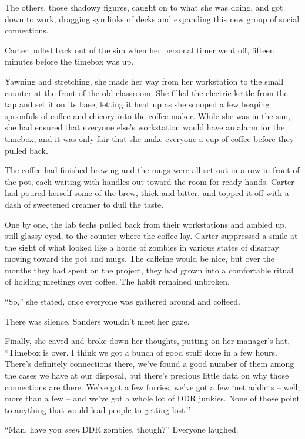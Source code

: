 The others, those shadowy figures, caught on to what she was doing, and got down to work, dragging symlinks of decks and expanding this new group of social connections.

\secdiv

Carter pulled back out of the sim when her personal timer went off, fifteen minutes before the timebox was up.

Yawning and stretching, she made her way from her workstation to the small counter at the front of the old classroom. She filled the electric kettle from the tap and set it on its base, letting it heat up as she scooped a few heaping spoonfuls of coffee and chicory into the coffee maker. While she was in the sim, she had ensured that everyone else's workstation would have an alarm for the timebox, and it was only fair that she make everyone a cup of coffee before they pulled back.

The coffee had finished brewing and the mugs were all set out in a row in front of the pot, each waiting with handles out toward the room for ready hands. Carter had poured herself some of the brew, thick and bitter, and topped it off with a dash of sweetened creamer to dull the taste.

One by one, the lab techs pulled back from their workstations and ambled up, still glassy-eyed, to the counter where the coffee lay. Carter suppressed a smile at the sight of what looked like a horde of zombies in various states of disarray moving toward the pot and mugs. The caffeine would be nice, but over the months they had spent on the project, they had grown into a comfortable ritual of holding meetings over coffee. The habit remained unbroken.

``So,'' she stated, once everyone was gathered around and coffeed.

There was silence. Sanders wouldn't meet her gaze.

Finally, she caved and broke down her thoughts, putting on her manager's hat, ``Timebox is over. I think we got a bunch of good stuff done in a few hours. There's definitely connections there, we've found a good number of them among the cases we have at our disposal, but there's precious little data on why those connections are there. We've got a few furries, we've got a few `net addicts -- well, more than a few -- and we've got a whole lot of DDR junkies. None of those point to anything that would lead people to getting lost.''

``Man, have you \textit{seen} DDR zombies, though?'' Everyone laughed.

